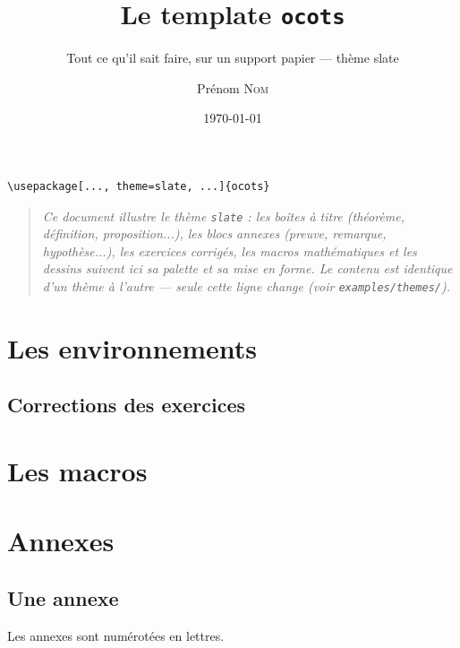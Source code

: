 \documentclass[11pt,twoside]{ocots-book}
\title{Le template \texttt{ocots}}
\subtitle{Tout ce qu'il sait faire, sur un support papier --- thème slate}
\author{Prénom \textsc{Nom}}
\date{\today}
\begin{document}
\dominitoc%

\frontmatter%
\maketitle

\begin{lstlisting}
\usepackage[..., theme=slate, ...]{ocots}
\end{lstlisting}
\begin{quote}\itshape
Ce document illustre le th\`eme \texttt{slate} : les bo\^ites \`a titre
(th\'eor\`eme, d\'efinition, proposition...), les blocs annexes (preuve,
remarque, hypoth\`ese...), les exercices corrig\'es, les macros
math\'ematiques et les dessins suivent ici sa palette et sa mise en forme.
Le contenu est identique d'un th\`eme \`a l'autre --- seule cette ligne
change (voir \texttt{examples/themes/}).
\end{quote}

\tableofcontents

\mainmatter%

\part{Les environnements}%
\label{part:env}

\ocotscollectsolutions%





\chapter{Corrections des exercices}%
\label{chap:solutions}
\ocotsprintsolutions%

\part{Les macros}%
\label{part:macros}




\part{Annexes}%
\label{part:appendix}

\begin{appendix}
    \chapter{Une annexe}%
    \label{chap:appendix}
    \minitoc%

    Les annexes sont numérotées en lettres.
\end{appendix}

\backmatter%
\printindex%
\end{document}
